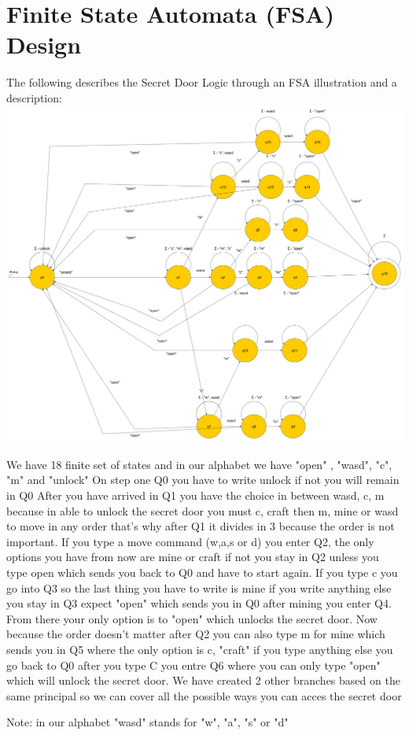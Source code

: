 \section{Finite State Automata (FSA) Design} \label{section: fsa design}
The following describes the Secret Door Logic through an FSA illustration and a description: \\
{\includegraphics[width=\textwidth,height=\textheight,keepaspectratio]{../dfa.png}}

We have 18 finite set of states and in our alphabet we have "open" , "wasd", "c", "m" and "unlock" 
On step one Q0 you have to write unlock if not you will remain in Q0
After you have arrived  in Q1 you have the choice in between wasd, c, m because in able to unlock the secret door you must c, craft then m, mine or wasd to move in any order that's why after Q1 it divides in 3 because the order is not important.
If you type a move command (w,a,s or d) you enter Q2, the only options you have from now are mine or craft if not you stay in Q2 unless you type open which sends you back to Q0 and have to start again. If you type c you go into Q3 so the last thing you have to write is mine if you write anything else you stay in Q3 expect "open" which sends you in Q0 after mining you enter Q4. From there your only option is to "open" which unlocks the secret door.
Now because the order doesn't matter after Q2  you can also type m for mine which sends you in Q5 where the only option is c, "craft" if you type anything else you go back to Q0 after you type C you entre Q6 where you can only type "open" which will unlock the secret door.
We have created 2 other branches based on the same principal so we can cover all the possible ways you can acces the secret door

Note: in our alphabet "wasd" stands for "w", "a", "s" or "d" 
